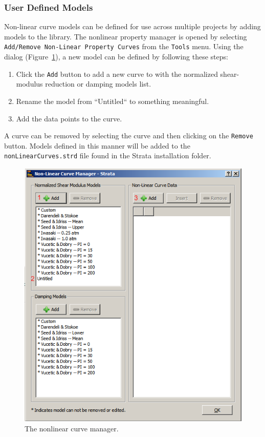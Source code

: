 \documentclass[11pt]{report}
\begin{document}
\subsubsection{User Defined Models}
Non-linear curve models can be defined for use across multiple projects by adding models to the
library.  The nonlinear property manager is opened by selecting \texttt{Add/Remove Non-Linear
Property Curves} from the \texttt{Tools} menu.  Using the dialog
(Figure~\ref{fig:strata:nonLinearCurveManager}), a new model can be defined by following these
steps:
\begin{enumerate}
  \item Click the \texttt{Add} button to add a new curve to with the normalized shear-modulus
	reduction or damping models list.
  \item Rename the model from ``Untitled`` to something meaningful.
  \item Add the data points to the curve.
\end{enumerate}
A curve can be removed by selecting the curve and then clicking on the \texttt{Remove} button.
Models defined in this manner will be added to the \texttt{nonLinearCurves.strd} file found in the
Strata installation folder.

\begin{figure}[p]
  \begin{center}
	\includegraphics[width=\linewidth]{figures/strata/nonLinearPropertyManager.png}
  \end{center}
  \caption{The nonlinear curve manager.}
  \label{fig:strata:nonLinearCurveManager}
\end{figure}
\end{document}
